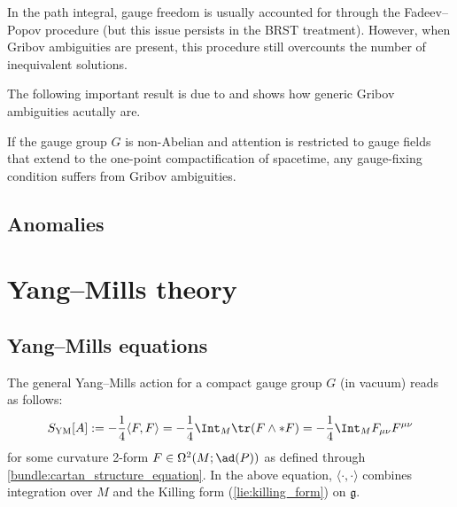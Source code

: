
    In the path integral, gauge freedom is usually accounted for through the Fadeev--Popov procedure (but this issue persists in the BRST treatment). However, when Gribov ambiguities are present, this procedure still overcounts the number of inequivalent solutions.
    

    The following important result is due to  and shows how generic Gribov ambiguities acutally are.
    \begin{property}
        If the gauge group $G$ is non-Abelian and attention is restricted to gauge fields that extend to the one-point compactification of spacetime, any gauge-fixing condition suffers from Gribov ambiguities.
    \end{property}

\subsection{Anomalies}



\section{Yang--Mills theory}\label{section:yang_mills_theory}
\subsection{Yang--Mills equations}

    The general Yang--Mills action for a compact gauge group $G$ (in vacuum) reads as follows:
    \begin{gather}
        \label{gauge:YM_lagrangian}
        S_{\text{YM}}[A] := -\frac{1}{4}\langle F,F\rangle = -\frac{1}{4}\Int_M\tr(F\wedge\ast F) = -\frac{1}{4}\Int_MF_{\mu\nu}F^{\mu\nu}
    \end{gather}
    for some curvature 2-form $F\in\Omega^2(M;\ad(P))$ as defined through \cref{bundle:cartan_structure_equation}. In the above equation, $\langle\cdot,\cdot\rangle$ combines integration over $M$ and the Killing form (\cref{lie:killing_form}) on $\mathfrak{g}$.

